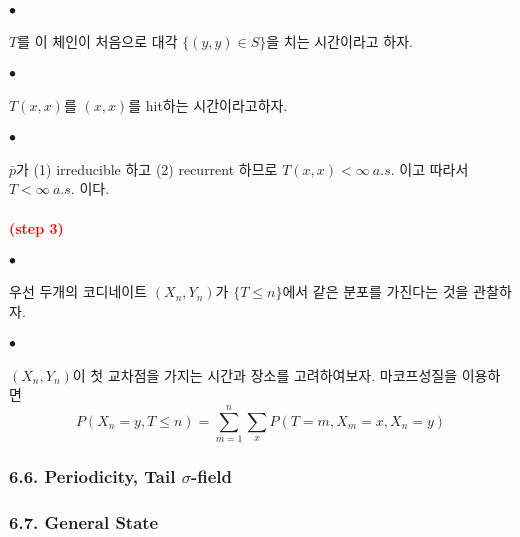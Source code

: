 \documentclass[12pt,oneside,english]{book}
\def\ck{\paragraph{\Large$\bullet$}\Large}
\newcommand{\parared}[1]{\paragraph{\Large\textcolor{red}{(#1)}}\Large}
\begin{document}
\ck $T$를 이 체인이 처음으로 대각 $\{(y,y)\in S\}$을 치는 시간이라고 하자. 

\ck $T(x,x)$를 $(x,x)$를 hit하는 시간이라고하자. 

\ck $\bar{p}$가 (1) irreducible 하고 (2) recurrent 하므로 $T(x,x)<\infty ~ a.s.$ 이고 따라서 $T <\infty ~ a.s.$ 이다. 

\parared{step 3} 

\ck 우선 두개의 코디네이트 $(X_n,Y_n)$가 $\{T\leq n\}$에서 같은 분포를 가진다는 것을 관찰하자. 

\ck $(X_n,Y_n)$이 첫 교차점을 가지는 시간과 장소를 고려하여보자. 마코프성질을 이용하면 
\[
P(X_n=y,T\leq n)= \sum_{m=1}^{n}\sum_xP(T=m,X_m=x,X_n=y)
\]


\subsubsection{6.6. Periodicity, Tail $\sigma$-field}

\subsubsection{6.7. General State}
\end{document}

